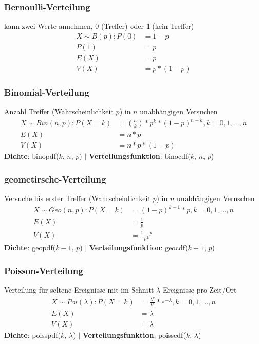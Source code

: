 \documentclass[landscape,twocolumn,a4paper]{article}
\begin{document}
\subsubsection*{Bernoulli-Verteilung}
kann zwei Werte annehmen, 0 (Treffer) oder 1 (kein Treffer)
\begin{align*}
	X \sim B(p): P(0) &= 1 - p \\
	P(1) &= p \\
	E(X) &= p \\
	V(X) &= p*(1-p)
\end{align*} 

\subsubsection*{Binomial-Verteilung}
Anzahl Treffer (Wahrscheinlichkeit $p$) in $n$ unabhängigen Versuchen
\begin{align*}
	X \sim Bin(n,p): P(X=k) &= \binom{n}{k} * p^k * (1-p)^{n-k}, k=0,1, \dots, n \\
	E(X) &= n*p \\
	V(X) &= n*p*(1-p)
\end{align*} 
\textbf{Dichte}: binopdf($k$, $n$, $p$) $\mid$ \textbf{Verteilungsfunktion}: binocdf($k$, $n$, $p$)


\subsubsection*{geometirsche-Verteilung}
Versuche bis erster Treffer (Wahrscheinlichkeit $p$) in $n$ unabhängigen Veruschen
\begin{align*}
	X \sim Geo(n,p): P(X=k) &= (1-p)^{k-1}*p, k=0,1, \dots, n \\
	E(X) &= \frac{1}{p}\\
	V(X) &= \frac{1-p}{p^2}
\end{align*} 
\textbf{Dichte}: geopdf($k-1$, $p$) $\mid$ \textbf{Verteilungsfunktion}: geocdf($k-1$, $p$)

\subsubsection*{Poisson-Verteilung}
Verteilung für seltene Ereignisse mit im Schnitt $\lambda$ Ereignisse pro Zeit/Ort
\begin{align*}
	X \sim Poi(\lambda): P(X = k) &=\frac{\lambda^k}{k!}*e^{-\lambda}, k=0,1, \dots, n \\
	E(X) &= \lambda\\
	V(X) &= \lambda
\end{align*} 
\textbf{Dichte}: poisspdf($k$, $\lambda$) $\mid$ \textbf{Verteilungsfunktion}: poisscdf($k$, $\lambda$)
\end{document}
